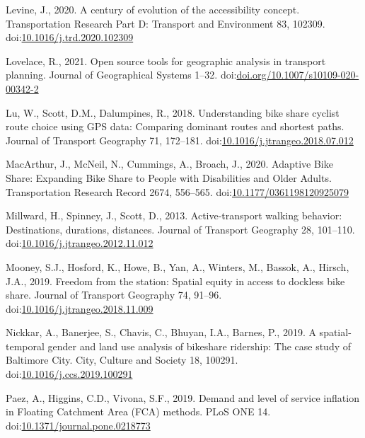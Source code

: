 \documentclass[]{elsarticle} %
\begin{document}
\leavevmode\hypertarget{ref-levineCenturyEvolutionAccessibility2020}{}%
Levine, J., 2020. A century of evolution of the accessibility concept.
Transportation Research Part D: Transport and Environment 83, 102309.
doi:\href{https://doi.org/10.1016/j.trd.2020.102309}{10.1016/j.trd.2020.102309}

\leavevmode\hypertarget{ref-lovelace2021open}{}%
Lovelace, R., 2021. Open source tools for geographic analysis in
transport planning. Journal of Geographical Systems 1--32.
doi:\href{https://doi.org/doi.org/10.1007/s10109-020-00342-2}{doi.org/10.1007/s10109-020-00342-2}

\leavevmode\hypertarget{ref-luUnderstandingBikeShare2018}{}%
Lu, W., Scott, D.M., Dalumpines, R., 2018. Understanding bike share
cyclist route choice using GPS data: Comparing dominant routes and
shortest paths. Journal of Transport Geography 71, 172--181.
doi:\href{https://doi.org/10.1016/j.jtrangeo.2018.07.012}{10.1016/j.jtrangeo.2018.07.012}

\leavevmode\hypertarget{ref-macarthurAdaptiveBikeShare2020}{}%
MacArthur, J., McNeil, N., Cummings, A., Broach, J., 2020. Adaptive Bike
Share: Expanding Bike Share to People with Disabilities and Older
Adults. Transportation Research Record 2674, 556--565.
doi:\href{https://doi.org/10.1177/0361198120925079}{10.1177/0361198120925079}

\leavevmode\hypertarget{ref-millwardActivetransportWalkingBehavior2013}{}%
Millward, H., Spinney, J., Scott, D., 2013. Active-transport walking
behavior: Destinations, durations, distances. Journal of Transport
Geography 28, 101--110.
doi:\href{https://doi.org/10.1016/j.jtrangeo.2012.11.012}{10.1016/j.jtrangeo.2012.11.012}

\leavevmode\hypertarget{ref-mooneyFreedomStationSpatial2019}{}%
Mooney, S.J., Hosford, K., Howe, B., Yan, A., Winters, M., Bassok, A.,
Hirsch, J.A., 2019. Freedom from the station: Spatial equity in access
to dockless bike share. Journal of Transport Geography 74, 91--96.
doi:\href{https://doi.org/10.1016/j.jtrangeo.2018.11.009}{10.1016/j.jtrangeo.2018.11.009}

\leavevmode\hypertarget{ref-nickkarSpatialtemporalGenderLand2019}{}%
Nickkar, A., Banerjee, S., Chavis, C., Bhuyan, I.A., Barnes, P., 2019. A
spatial-temporal gender and land use analysis of bikeshare ridership:
The case study of Baltimore City. City, Culture and Society 18, 100291.
doi:\href{https://doi.org/10.1016/j.ccs.2019.100291}{10.1016/j.ccs.2019.100291}

\leavevmode\hypertarget{ref-paezDemandLevelService2019}{}%
Paez, A., Higgins, C.D., Vivona, S.F., 2019. Demand and level of service
inflation in Floating Catchment Area (FCA) methods. PLoS ONE 14.
doi:\href{https://doi.org/10.1371/journal.pone.0218773}{10.1371/journal.pone.0218773}
\end{document}

